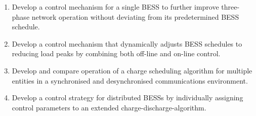 \begin{enumerate}[
labelindent=*,
style=multiline,
leftmargin=*,
label=\textbf{Objective~\arabic*}
]
	\item \label{objective-1} Develop a control mechanism for a single BESS to further improve three-phase network operation without deviating from its predetermined BESS schedule.
	\item \label{objective-2} Develop a control mechanism that dynamically adjusts BESS schedules to reducing load peaks by combining both off-line and on-line control.
	\item \label{objective-3} Develop and compare operation of a charge scheduling algorithm for multiple entities in a synchronised and desynchronised communications environment.
	\item \label{objective-4} Develop a control strategy for distributed BESSs by individually assigning control parameters to an extended charge-discharge-algorithm.
\end{enumerate}

